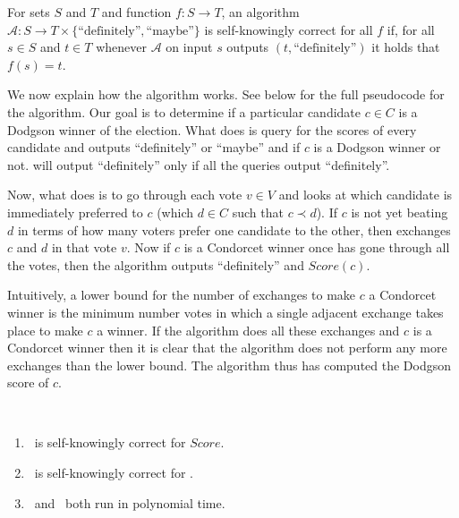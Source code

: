 \begin{defn}
	For sets $S$ and $T$ and function $f: S \rightarrow T$,
	an algorithm $\mathcal{A}: S \rightarrow T \times
	\{\text{``definitely''}, \text{``maybe''}\}$ is
	self-knowingly correct for all $f$ if, for all $s \in S$
	and $t \in T$ whenever $\mathcal{A}$ on input $s$ outputs
	$(t, \text{``definitely''})$ it holds that $f(s) = t$.
\end{defn}



We now explain how the algorithm works.
See below for the full pseudocode for the algorithm.
Our goal is to determine if a particular candidate $c \in C$ is
a Dodgson winner of the election.
What \gwin does is query \gscore for the scores of every candidate
and outputs ``definitely'' or ``maybe'' and if $c$ is a Dodgson winner or not.
\gwin will output ``definitely'' only if all the \gscore queries output
``definitely''.

Now, what \gscore does is to go through each vote $v \in V$ and looks at
which candidate is immediately preferred to $c$ (which $d\in C$ such that
$c \prec d$).
If $c$ is not yet beating $d$ in terms of how many voters prefer one candidate
to the other, then \gscore exchanges $c$ and $d$ in that vote $v$.
Now if $c$ is a Condorcet winner once \gscore has gone through all the votes,
then the algorithm outputs ``definitely'' and $Score(c)$.

Intuitively, a lower bound for the number of exchanges to make $c$ a Condorcet
winner is the minimum number votes in which a single adjacent exchange takes place
to make $c$ a winner.
If the algorithm does all these exchanges and $c$ is a Condorcet winner then
it is clear that the algorithm does not perform any more exchanges than the
lower bound.
The algorithm thus has computed the Dodgson score of $c$.

\begin{theorem} ~
	\begin{enumerate}
		\item \gscore~is self-knowingly correct for $Score$.
		\item \gwin~is self-knowingly correct for \dwin.
		\item \gscore~and \gwin~both run in polynomial time.
	\end{enumerate}
\end{theorem}

